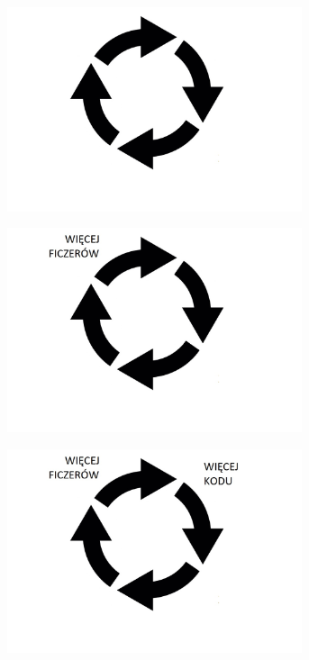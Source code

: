 \documentclass{beamer}
\begin{document}
\begin{frame}{}
\begin{center}
  	\includegraphics[height=6cm]{pgf1.jpg}
\end{center}
\end{frame}

\begin{frame}{}
\begin{center}
  	\includegraphics[height=6cm]{pgf2.jpg}
\end{center}
\end{frame}

\begin{frame}{}
\begin{center}
  	\includegraphics[height=6cm]{pgf3.jpg}
\end{center}
\end{frame}
\end{document}
